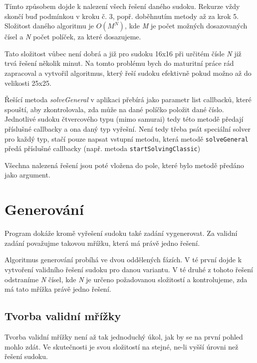 \documentclass[a4paper,oneside,12pt]{report}
\begin{document}
Tímto způsobem dojde k nalezení všech řešení daného sudoku. Rekurze vždy skončí buď podmínkou v kroku č. 3, popř. doběhnutím metody až za krok 5. Složitost daného algoritmu je $O(M^{N})$, kde \textit{M} je počet možných dosazovaných čísel a \textit{N} počet políček, za které dosazujeme.

Tato složitost vůbec není dobrá a již pro sudoku 16x16 při určitém čísle \textit{N} již trvá řešení několik minut. Na tomto problému bych do maturitní práce rád zapracoval a vytvořil algoritmus, který řeší sudoku efektivně pokud možno až do velikosti 25x25.

Řešící metoda \textit{solveGeneral} v aplikaci přebírá jako parametr list callbacků, které spouští, aby zkontrolovala, zda může na dané políčko položit dané číslo. Jednotlivé sudoku čtvercového typu (mimo samurai) tedy této metodě předají příslušné callbacky a ona daný typ vyřešní. Není tedy třeba psát speciální solver pro každý typ, stačí pouze napsat vstupní metodu, která metodě \texttt{solveGeneral} předá příslušné callbacky (např. metoda \texttt{startSolvingClassic})

Všechna nalezená řešení jsou poté vložena do pole, které bylo metodě předáno jako argument.

\section{Generování}
Program dokáže kromě vyřešení sudoku také zadání vygenerovat. Za validní zadání považujme takovou mřížku, která má právě jedno řešení.

Algoritmus generování probíhá ve dvou oddělených fázích. V té první dojde k vytvoření validního řešení sudoku pro danou variantu. V té druhé z tohoto řešení odstraníme \textit{N} čísel, kde \textit{N} je určeno požadovanou složitostí a kontrolujeme, zda má tato mřížka právě jedno řešení.

\subsection{Tvorba validní mřížky}
Tvorba validní mřížky není až tak jednoduchý úkol, jak by se na první pohled mohlo zdát. Ve skutečnosti je svou složitostí na stejné, ne-li vyšší úrovni než řešení sudoku.
\end{document}
